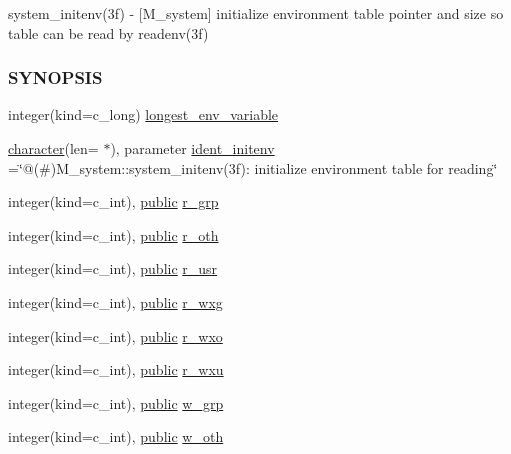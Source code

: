 \begin{DoxyCompactItemize}
\begin{DoxyCompactList}
system\+\_\+initenv(3f) -\/ \mbox{[}M\+\_\+system\mbox{]} initialize environment table pointer and size so table can be read by readenv(3f) \subsubsection*{S\+Y\+N\+O\+P\+S\+IS}\end{DoxyCompactList}\item 
integer(kind=c\+\_\+long) \hyperlink{namespacem__system_ac066b6866f8ef4b8c358ec8daca7566c}{longest\+\_\+env\+\_\+variable}
\item 
\hyperlink{option__stopwatch_83_8txt_abd4b21fbbd175834027b5224bfe97e66}{character}(len= $\ast$), parameter \hyperlink{namespacem__system_a7246c40d96a190aabdd8a002c963c2d0}{ident\+\_\+initenv} =\char`\"{}@(\#)M\+\_\+system\+::system\+\_\+initenv(3f)\+: initialize environment table for reading\char`\"{}
\item 
integer(kind=c\+\_\+int), \hyperlink{M__stopwatch_83_8txt_a2f74811300c361e53b430611a7d1769f}{public} \hyperlink{namespacem__system_adb853ed1f9d39c45e0b512ab39c66605}{r\+\_\+grp}
\item 
integer(kind=c\+\_\+int), \hyperlink{M__stopwatch_83_8txt_a2f74811300c361e53b430611a7d1769f}{public} \hyperlink{namespacem__system_a74de84d2cb6b74e9d0d4c5aa5f1ba953}{r\+\_\+oth}
\item 
integer(kind=c\+\_\+int), \hyperlink{M__stopwatch_83_8txt_a2f74811300c361e53b430611a7d1769f}{public} \hyperlink{namespacem__system_ace7825dd19ed7191b37d3a7a27c75431}{r\+\_\+usr}
\item 
integer(kind=c\+\_\+int), \hyperlink{M__stopwatch_83_8txt_a2f74811300c361e53b430611a7d1769f}{public} \hyperlink{namespacem__system_a23aade9d4537c4260c2e44ef6a619db6}{r\+\_\+wxg}
\item 
integer(kind=c\+\_\+int), \hyperlink{M__stopwatch_83_8txt_a2f74811300c361e53b430611a7d1769f}{public} \hyperlink{namespacem__system_a9467bf0bb7ae96061314b865bde14f57}{r\+\_\+wxo}
\item 
integer(kind=c\+\_\+int), \hyperlink{M__stopwatch_83_8txt_a2f74811300c361e53b430611a7d1769f}{public} \hyperlink{namespacem__system_a10b9cc52ae68d1b64dd9f8ea4cfcd3be}{r\+\_\+wxu}
\item 
integer(kind=c\+\_\+int), \hyperlink{M__stopwatch_83_8txt_a2f74811300c361e53b430611a7d1769f}{public} \hyperlink{namespacem__system_ada5683bd408b30753f7565a1bb54b339}{w\+\_\+grp}
\item 
integer(kind=c\+\_\+int), \hyperlink{M__stopwatch_83_8txt_a2f74811300c361e53b430611a7d1769f}{public} \hyperlink{namespacem__system_a1801bba1e36a51345d442f73839c93d2}{w\+\_\+oth}

\end{DoxyCompactItemize}
